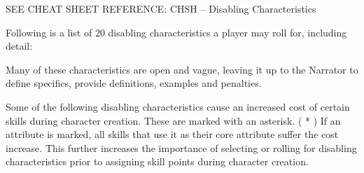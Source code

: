 SEE CHEAT SHEET REFERENCE: CHSH – Disabling Characteristics

Following is a list of 20 disabling characteristics a player may roll for, including detail:

Many of these characteristics are open and vague, leaving it up to the Narrator to define specifics, provide definitions, examples and penalties.

Some of the following disabling characteristics cause an increased cost of certain skills during character creation. These are marked with an asterisk. ( * ) If an attribute is marked, all skills that use it as their core attribute suffer the cost increase. This further increases the importance of selecting or rolling for disabling characteristics prior to assigning skill points during character creation.

